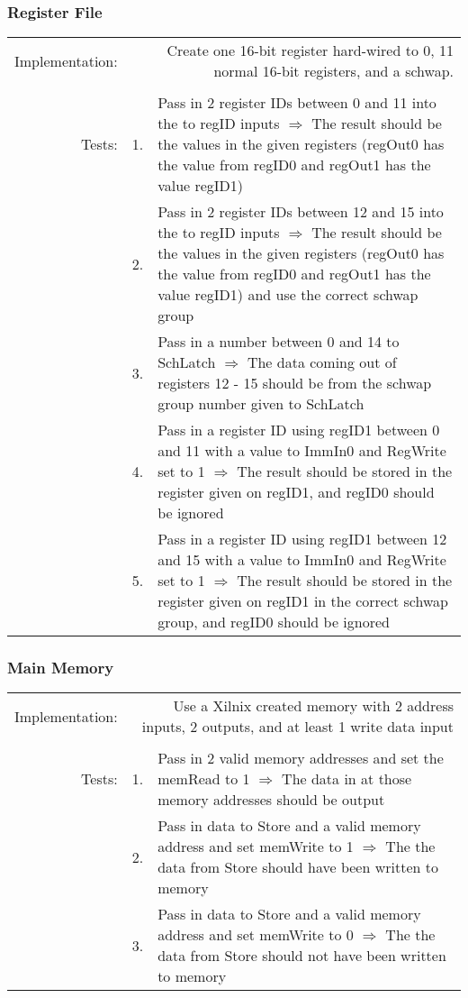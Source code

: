 		\subsubsection{Register File}
			\begin{tabular}{ r  r  p{12cm} }
				Implementation: & \multicolumn{2}{p{12.75cm}}{Create one 16-bit register hard-wired to 0, 11 normal 16-bit registers, and a schwap.}\\
				                &    & \\
				         Tests: & 1. & Pass in 2 register IDs between 0 and 11 into the to regID inputs $\Rightarrow$ The result should be the values in the given registers (regOut0 has the value from regID0 and regOut1 has the value regID1)\\
				                & 2. & Pass in 2 register IDs between 12 and 15 into the to regID inputs $\Rightarrow$ The result should be the values in the given registers (regOut0 has the value from regID0 and regOut1 has the value regID1) and use the correct schwap group\\
				                & 3. & Pass in a number between 0 and 14 to SchLatch $\Rightarrow$ The data coming out of registers 12 - 15 should be from the schwap group number given to SchLatch\\
				                & 4. & Pass in a register ID using regID1 between 0 and 11 with a value to ImmIn0 and RegWrite set to 1 $\Rightarrow$ The result should be stored in the register given on regID1, and regID0 should be ignored\\
				                & 5. & Pass in a register ID using regID1 between 12 and 15 with a value to ImmIn0 and RegWrite set to 1 $\Rightarrow$ The result should be stored in the register given on regID1 in the correct schwap group, and regID0 should be ignored\\
			\end{tabular}
		\subsubsection{Main Memory}
			\begin{tabular}{ r  r  p{12cm} }
				Implementation: & \multicolumn{2}{p{12.75cm}}{Use a Xilnix created memory with 2 address inputs, 2 outputs, and at least 1 write data input}\\
				                &    & \\
				         Tests: & 1. & Pass in 2 valid memory addresses and set the memRead to 1 $\Rightarrow$ The data in at those memory addresses should be output\\
				                & 2. & Pass in data to Store and a valid memory address and set memWrite to 1 $\Rightarrow$ The the data from Store should have been written to memory\\
				                & 3. & Pass in data to Store and a valid memory address and set memWrite to 0 $\Rightarrow$ The the data from Store should not have been written to memory\\
			\end{tabular}
